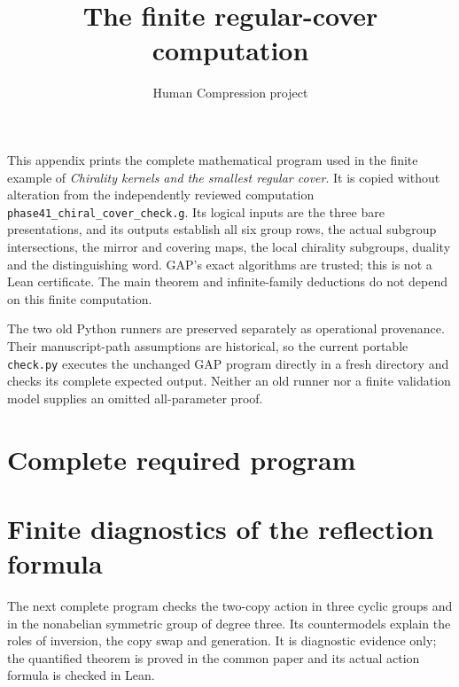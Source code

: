 
\title{The finite regular-cover computation}
\author{Human Compression project}
\maketitle
This appendix prints the complete mathematical program used in the finite example of \emph{Chirality kernels and the smallest regular cover}. It is copied without alteration from the independently reviewed computation \texttt{phase41\_chiral\_cover\_check.g}. Its logical inputs are the three bare presentations, and its outputs establish all six group rows, the actual subgroup intersections, the mirror and covering maps, the local chirality subgroups, duality and the distinguishing word. GAP's exact algorithms are trusted; this is not a Lean certificate. The main theorem and infinite-family deductions do not depend on this finite computation.

The two old Python runners are preserved separately as operational provenance. Their manuscript-path assumptions are historical, so the current portable \texttt{check.py} executes the unchanged GAP program directly in a fresh directory and checks its complete expected output. Neither an old runner nor a finite validation model supplies an omitted all-parameter proof.
\section*{Complete required program}

\section*{Finite diagnostics of the reflection formula}
The next complete program checks the two-copy action in three cyclic groups and in the nonabelian symmetric group of degree three. Its countermodels explain the roles of inversion, the copy swap and generation. It is diagnostic evidence only; the quantified theorem is proved in the common paper and its actual action formula is checked in Lean.


